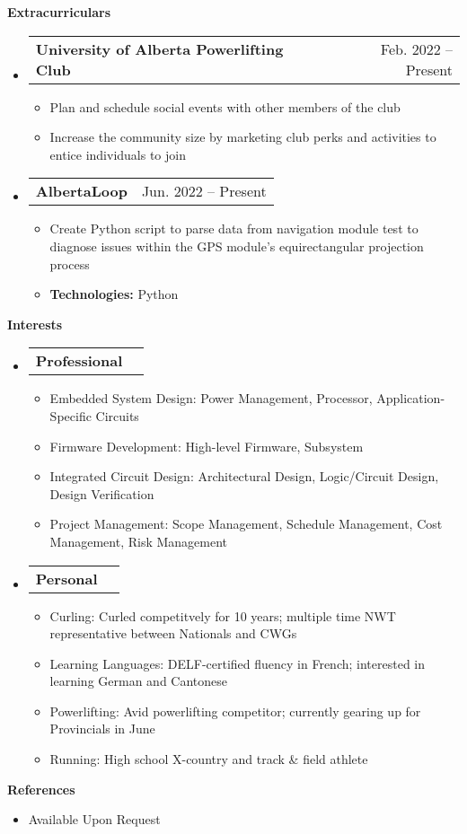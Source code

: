 \documentclass[letterpaper,12pt]{article}[leftmargin=*]
\makeatletter
\def \entryspacing {-0pt}
\renewcommand{\section}[2]{\vspace{5pt}
  \colorbox{secondary}{\color{white}\raggedbottom\normalsize\textbf{{#1}{\hspace{7pt}#2}}}
}
\newcommand{\resumeEntryStart}{\begin{itemize}[leftmargin=2.5mm]}
\newcommand{\resumeEntryEnd}{\end{itemize}\vspace{\entryspacing}}
\newcommand{\resumeItemListStart}{\begin{itemize}[leftmargin=4.5mm]}
\newcommand{\resumeItemListEnd}{\end{itemize}}
\newcommand{\resumeItem}[1]{
  \item\small{
    {#1 \vspace{-2pt}}
  }
}
\newcommand{\resumeEntryTD}[2]{
  \vspace{-1pt}\item[]
    \begin{tabularx}{0.97\textwidth}{X@{\hspace{60pt}}r}
      \textbf{\color{primary}#1} & {\firabook\color{accent}\small#2} \\
    \end{tabularx}\vspace{-6pt}
}
\newcommand{\resumeEntryS}[2]{
  \item[]\small{
    \textbf{\color{primary}#1 }{ #2 \vspace{-6pt}}
  }
}
\makeatother
\begin{document}
\section{\faGroup}{Extracurriculars}

 \resumeEntryStart
  \resumeEntryTD{University of Alberta Powerlifting Club}{Feb. 2022 -- Present}
    \resumeItemListStart
      \resumeItem{Plan and schedule social events with other members of the club}
      \resumeItem{Increase the community size by marketing club perks and activities to entice individuals to join} 
    \resumeItemListEnd
 \resumeEntryEnd

 \resumeEntryStart
 \resumeEntryTD{AlbertaLoop}{Jun. 2022 -- Present}
 \resumeItemListStart
      \resumeItem {Create Python script to parse data from navigation module test to diagnose issues within the GPS module's equirectangular projection process}
      \resumeItem {\textbf{Technologies:} Python}
    \resumeItemListEnd
 \resumeEntryEnd

\section{\faGamepad}{Interests}

 \resumeEntryStart
  \resumeEntryTD{Professional}{}%
   \resumeItemListStart
    \resumeItem{Embedded System Design: Power Management, Processor, Application-Specific Circuits}
    \resumeItem{Firmware Development: High-level Firmware, Subsystem}
    \resumeItem{Integrated Circuit Design: Architectural Design, Logic/Circuit Design, Design Verification}
    \resumeItem{Project Management: Scope Management, Schedule Management, Cost Management, Risk Management}
   \resumeItemListEnd

  \resumeEntryTD{Personal}{}%
   \resumeItemListStart
    \resumeItem{Curling: Curled competitvely for 10 years; multiple time NWT representative between Nationals and CWGs}
    \resumeItem{Learning Languages: DELF-certified fluency in French; interested in learning German and Cantonese}
    \resumeItem{Powerlifting: Avid powerlifting competitor; currently gearing up for Provincials in June}
    \resumeItem{Running: High school X-country and track \& field athlete}
   \resumeItemListEnd
 \resumeEntryEnd
\section{\faEnvelope}{References}

 \resumeEntryStart
  \resumeEntryS{}{Available Upon Request}
 \resumeEntryEnd
\end{document}
